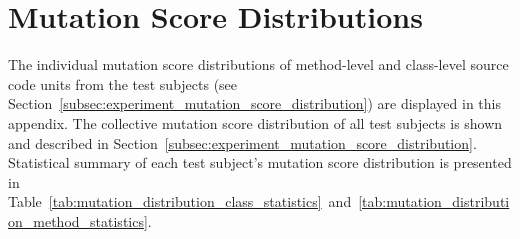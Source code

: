 \appendix
\chapter{Mutation Score Distributions}
\label{app:mutation_score_distributions}
The individual mutation score distributions of method-level and class-level source code units from the test subjects (see Section~\ref{subsec:experiment_mutation_score_distribution}) are displayed in this appendix. The collective mutation score distribution of all test subjects is shown and described in Section~\ref{subsec:experiment_mutation_score_distribution}. Statistical summary of each test subject's mutation score distribution is presented in Table~\ref{tab:mutation_distribution_class_statistics}~and~\ref{tab:mutation_distribution_method_statistics}.

